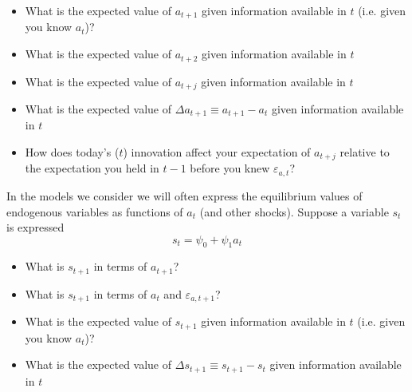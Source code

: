 \documentclass[authoryear,11pt]{elsarticle}
\begin{document}
\begin{itemize}
\item	What is the expected value of $a_{t+1}$ given information available in $t$ (i.e. given you know $a_{t}$)?
\item	What is the expected value of $a_{t+2}$ given information available in $t$
\item	What is the expected value of $a_{t+j}$ given information available in $t$
\item	What is the expected value of $\Delta a_{t+1} \equiv a_{t+1} - a_{t}$ given information available in $t$
\item	How does today's ($t$) innovation affect your expectation of $a_{t+j}$ relative to the expectation you held in $t-1$ before you knew $\varepsilon_{a,t}$?
\end{itemize}

In the models we consider we will often express the equilibrium values of endogenous variables as functions of $a_{t}$ (and other shocks). Suppose a variable $s_{t}$ is expressed
\[
s_{t} = \psi_{0} + \psi_{1} a_{t}
\]
\begin{itemize}
\item	What is $s_{t+1}$ in terms of $a_{t+1}$?
\item	What is $s_{t+1}$ in terms of $a_{t}$ and $\varepsilon_{a,t+1}$?
\item	What is the expected value of $s_{t+1}$ given information available in $t$ (i.e. given you know $a_{t}$)?
\item	What is the expected value of $\Delta s_{t+1} \equiv s_{t+1} - s_{t}$ given information available in $t$
\end{itemize}
\end{document}
